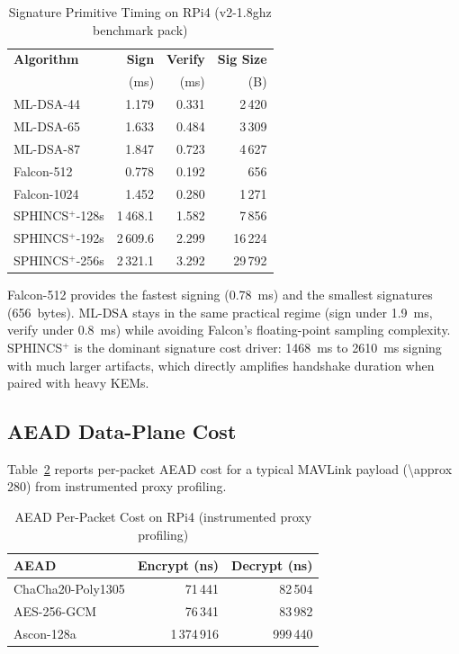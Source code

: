 \documentclass[conference]{IEEEtran}
\begin{document}
\begin{table}[t]
\centering
\caption{Signature Primitive Timing on RPi4 (v2-1.8ghz benchmark pack)}
\label{tab:sig-timing}
\small
\begin{tabular}{@{}lrrr@{}}
\toprule
\textbf{Algorithm} & \textbf{Sign} & \textbf{Verify} & \textbf{Sig Size} \\
 & (ms) & (ms) & (B) \\
\midrule
ML-DSA-44 & 1.179 & 0.331 & 2\,420 \\
ML-DSA-65 & 1.633 & 0.484 & 3\,309 \\
ML-DSA-87 & 1.847 & 0.723 & 4\,627 \\
\midrule
Falcon-512 & 0.778 & 0.192 & 656 \\
Falcon-1024 & 1.452 & 0.280 & 1\,271 \\
\midrule
SPHINCS$^+$-128s & 1\,468.1 & 1.582 & 7\,856 \\
SPHINCS$^+$-192s & 2\,609.6 & 2.299 & 16\,224 \\
SPHINCS$^+$-256s & 2\,321.1 & 3.292 & 29\,792 \\
\bottomrule
\end{tabular}
\end{table}

Falcon-512 provides the fastest signing (\SI{0.78}{\milli\second}) and the smallest signatures (656~bytes).
ML-DSA stays in the same practical regime (sign under \SI{1.9}{\milli\second}, verify under \SI{0.8}{\milli\second}) while avoiding Falcon's floating-point sampling complexity.
SPHINCS$^+$ is the dominant signature cost driver: \SI{1468}{\milli\second} to \SI{2610}{\milli\second} signing with much larger artifacts, which directly amplifies handshake duration when paired with heavy KEMs.

\subsection{AEAD Data-Plane Cost}

Table~\ref{tab:aead-timing} reports per-packet AEAD cost for a typical MAVLink payload (\SI{\approx 280}{\byte}) from instrumented proxy profiling.

\begin{table}[t]
\centering
\caption{AEAD Per-Packet Cost on RPi4 (instrumented proxy profiling)}
\label{tab:aead-timing}
\small
\begin{tabular}{@{}lrr@{}}
\toprule
\textbf{AEAD} & \textbf{Encrypt (ns)} & \textbf{Decrypt (ns)} \\
\midrule
ChaCha20-Poly1305 & 71\,441 & 82\,504 \\
AES-256-GCM & 76\,341 & 83\,982 \\
Ascon-128a & 1\,374\,916 & 999\,440 \\
\bottomrule
\end{tabular}
\end{table}
\end{document}
